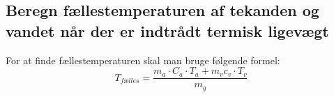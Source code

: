 \subsection{Beregn fællestemperaturen af tekanden og vandet når der er indtrådt termisk ligevægt}
For at finde fællestemperaturen skal man bruge følgende formel:
\begin{equation*}
    T_{fælles}= \frac{m_a \cdot C_a \cdot T_a + m_v c_v \cdot T_v}{m_g}
\end{equation*} %